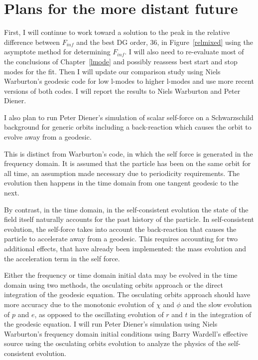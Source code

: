 \section{Plans for the more distant future}
First, I will continue to work toward a solution to the peak in the relative difference between $F_{inf}$ and the best DG order, 36, in Figure~\ref{relmixed} using the asymptote method for determining $F_{inf}$. I will also need to re-evaluate most of the conclusions of Chapter~\ref{lmode} and possibly reassess best start and stop modes for the fit. Then I will update our comparison study using Niels Warburton's geodesic code for low l-modes to higher l-modes and use more recent versions of both codes. I will report the results to Niels Warburton and Peter Diener. 

I also plan to run Peter Diener's simulation of scalar self-force on a Schwarzschild background for generic orbits including a back-reaction which causes the orbit to evolve away from a geodesic.

This is distinct from Warburton's code, in which the self force is generated in the frequency domain. It is assumed that the particle has been on the same orbit for all time, an assumption made necessary due to periodicity requirements. The evolution then happens in the time domain from one tangent geodesic to the next.

By contrast, in the time domain, in the self-consistent evolution the state of the field itself naturally accounts for the past history of the particle. In self-consistent evolution, the self-force takes into account the back-reaction that causes the particle to accelerate away from a geodesic. This requires accounting for two additional effects, that have already been implemented: the mass evolution and the acceleration term in the self force. 


Either the frequency or time domain initial data may be evolved in the time domain using two methods, the osculating orbits approach or the direct integration of the geodesic equation. The osculating orbits approach should have more accuracy due to the monotonic evolution of $\chi$ and $\phi$ and the slow evolution of $p$ and $e$, as opposed to the oscillating evolution of $r$ and $t$ in the integration of the geodesic equation. I will run Peter Diener's simulation using Niels Warburton's frequency domain initial conditions using Barry Wardell's effective source using the osculating orbits evolution to analyze the physics of the self-consistent evolution. 


